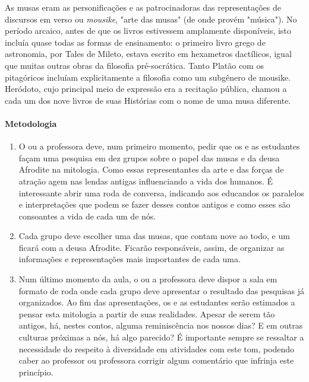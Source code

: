\documentclass[12pt]{extarticle}
\begin{document}
As musas eram as personificações e as patrocinadoras das representações de discursos 
em verso ou \textit{mousike}, "arte das musas" (de onde provém "música"). No período 
arcaico, antes de que os livros estivessem amplamente disponíveis, isto incluía quase 
todas as formas de ensinamento: o primeiro livro grego de astronomia, por Tales de Mileto, 
estava escrito em hexametros dactílicos, igual que muitas outras obras da filosofia pré-socrática. 
Tanto Platão com os pitagóricos incluíam explicitamente a filosofia como um subgênero de 
mousike. Heródoto, cujo principal meio de expressão era a recitação pública, chamou 
a cada um dos nove livros de suas Histórias com o nome de uma musa diferente.

\paragraph{Metodologia}

\begin{enumerate}

  \item
  O ou a professora deve, num primeiro momento, pedir que os e as estudantes façam
  uma pesquisa em dez grupos sobre o papel das musas e da deusa Afrodite na mitologia. 
  Como essas representantes da arte e das forças de atração agem nas lendas antigas 
  influenciando a vida dos humanos. É interessante abrir uma roda de conversa, 
  indicando aos educandos os paralelos e interpretações que podem se fazer desses 
  contos antigos e como esses são consoantes a vida de cada um de nós.

  \item
  Cada grupo deve escolher uma das musas, que contam nove ao todo, e um ficará com a deusa
  Afrodite. Ficarão responsáveis, assim, de organizar as informações e representações
  mais importantes de cada uma. 

  \item
  Num último momento da aula, o ou a professora deve dispor a sala em formato de 
  roda onde cada grupo deve apresentar o resultado das pesquisas já 
  organizados. Ao fim das apresentações, os e as estudantes serão estimados
  a pensar esta mitologia a partir de suas realidades. Apesar de serem tão antigos,
  há, nestes contos, alguma reminiscência nos nossos dias? E em outras culturas
  próximas a nós, há algo parecido? É importante sempre se ressaltar
  a necessidade do respeito à diversidade em atividades com este tom, podendo
  caber ao professor ou professora corrigir algum comentário que infrinja
  este princípio.

\end{enumerate}
\end{document}
